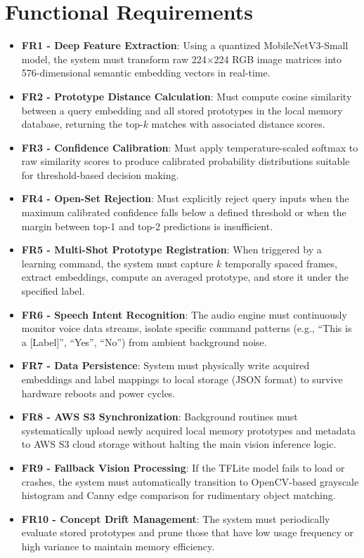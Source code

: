 \documentclass[12pt,a4paper]{report}
\begin{document}
\section{Functional Requirements}
\begin{itemize}
    \item \textbf{FR1 - Deep Feature Extraction}: Using a quantized MobileNetV3-Small model, the system must transform raw 224$\times$224 RGB image matrices into 576-dimensional semantic embedding vectors in real-time.
    \item \textbf{FR2 - Prototype Distance Calculation}: Must compute cosine similarity between a query embedding and all stored prototypes in the local memory database, returning the top-$k$ matches with associated distance scores.
    \item \textbf{FR3 - Confidence Calibration}: Must apply temperature-scaled softmax to raw similarity scores to produce calibrated probability distributions suitable for threshold-based decision making.
    \item \textbf{FR4 - Open-Set Rejection}: Must explicitly reject query inputs when the maximum calibrated confidence falls below a defined threshold or when the margin between top-1 and top-2 predictions is insufficient.
    \item \textbf{FR5 - Multi-Shot Prototype Registration}: When triggered by a learning command, the system must capture $k$ temporally spaced frames, extract embeddings, compute an averaged prototype, and store it under the specified label.
    \item \textbf{FR6 - Speech Intent Recognition}: The audio engine must continuously monitor voice data streams, isolate specific command patterns (e.g., ``This is a [Label]'', ``Yes'', ``No'') from ambient background noise.
    \item \textbf{FR7 - Data Persistence}: System must physically write acquired embeddings and label mappings to local storage (JSON format) to survive hardware reboots and power cycles.
    \item \textbf{FR8 - AWS S3 Synchronization}: Background routines must systematically upload newly acquired local memory prototypes and metadata to AWS S3 cloud storage without halting the main vision inference logic.
    \item \textbf{FR9 - Fallback Vision Processing}: If the TFLite model fails to load or crashes, the system must automatically transition to OpenCV-based grayscale histogram and Canny edge comparison for rudimentary object matching.
    \item \textbf{FR10 - Concept Drift Management}: The system must periodically evaluate stored prototypes and prune those that have low usage frequency or high variance to maintain memory efficiency.
\end{itemize}
\end{document}
